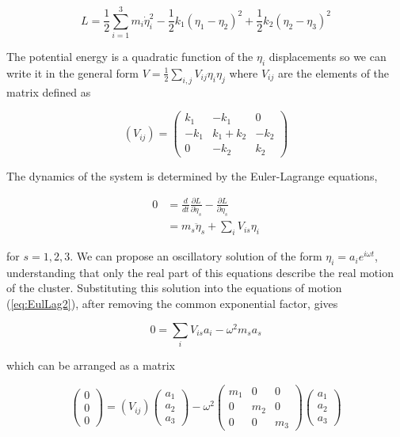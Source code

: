 \begin{equation}
L= \frac{1}{2}\sum_{i=1}^3 m_i \dot{\eta}_i^2-\frac{1}{2}k_1(\eta_1-\eta_2)^2+\frac{1}{2}k_2(\eta_2-\eta_3)^2
\end{equation}

The potential energy is a quadratic function of the $\eta_i$ displacements so we can write it in the general form $V=\frac{1}{2}\sum_{i,j}V_{ij}\eta_i\eta_j$ where $V_{ij}$ are the elements of the matrix defined as

\begin{equation}
(V_{ij})=\left( \begin{array}{ccc} k_1 & -k_1 & 0 \\ -k_1 & k_1+k_2 & -k_2 \\ 0 & -k_2 & k_2 \end{array} \right)
\end{equation}

The dynamics of the system is determined by the Euler-Lagrange equations,

\begin{align}
0 & = \frac{d}{dt}\frac{\partial L}{\partial \dot{\eta}_s}-\frac{\partial L}{\partial \eta_s} \label{eq:EulLag1} \\
  & = m_s \ddot{\eta}_s + \sum_i V_{is} \eta_i \label{eq:EulLag2}
\end{align}

\noindent for $s=1,2,3$. 
We can propose an oscillatory solution of the form $\eta_i=a_ie^{i\omega t}$, understanding that only the real part of this equations describe the real motion of the cluster. 
Substituting this solution into the equations of motion (\ref{eq:EulLag2}), after removing the common exponential factor, gives

\begin{equation}
0=\sum_i V_{is}a_i-\omega^2m_sa_s
\end{equation}

which can be arranged as a matrix

\begin{equation}
\left( \begin{array}{c} 0\\ 0\\ 0 \end{array}\right) = (V_{ij}) \left(\begin{array}{c} a_1 \\ a_2 \\ a_3 \end{array}\right) - \omega^2 \left( \begin{array}{ccc} m_1 & 0 & 0 \\ 0 & m_2 & 0 \\ 0 & 0 & m_3 \end{array}\right) \left(\begin{array}{c} a_1 \\ a_2 \\ a_3 \end{array}\right)
\end{equation}

